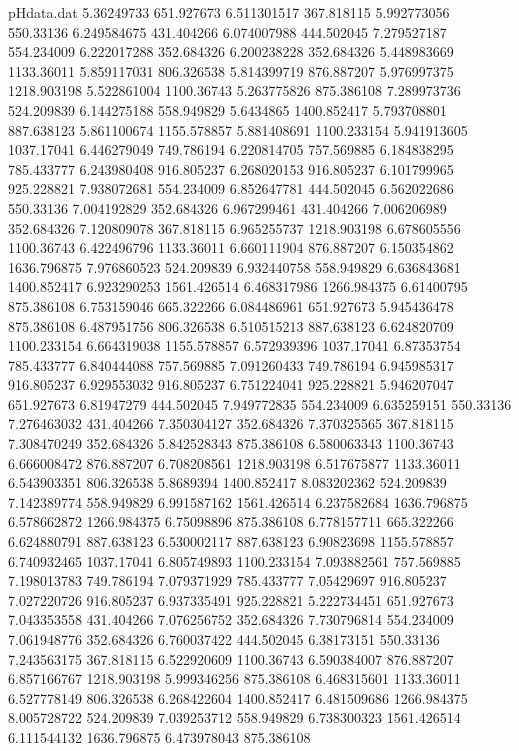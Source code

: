 \begin{filecontents}{pHdata.dat}
5.36249733	651.927673
6.511301517	367.818115
5.992773056	550.33136
6.249584675	431.404266
6.074007988	444.502045
7.279527187	554.234009
6.222017288	352.684326
6.200238228	352.684326
5.448983669	1133.36011
5.859117031	806.326538
5.814399719	876.887207
5.976997375	1218.903198
5.522861004	1100.36743
5.263775826	875.386108
7.289973736	524.209839
6.144275188	558.949829
5.6434865	1400.852417
5.793708801	887.638123
5.861100674	1155.578857
5.881408691	1100.233154
5.941913605	1037.17041
6.446279049	749.786194
6.220814705	757.569885
6.184838295	785.433777
6.243980408	916.805237
6.268020153	916.805237
6.101799965	925.228821
7.938072681	554.234009
6.852647781	444.502045
6.562022686	550.33136
7.004192829	352.684326
6.967299461	431.404266
7.006206989	352.684326
7.120809078	367.818115
6.965255737	1218.903198
6.678605556	1100.36743
6.422496796	1133.36011
6.660111904	876.887207
6.150354862	1636.796875
7.976860523	524.209839
6.932440758	558.949829
6.636843681	1400.852417
6.923290253	1561.426514
6.468317986	1266.984375
6.61400795	875.386108
6.753159046	665.322266
6.084486961	651.927673
5.945436478	875.386108
6.487951756	806.326538
6.510515213	887.638123
6.624820709	1100.233154
6.664319038	1155.578857
6.572939396	1037.17041
6.87353754	785.433777
6.840444088	757.569885
7.091260433	749.786194
6.945985317	916.805237
6.929553032	916.805237
6.751224041	925.228821
5.946207047	651.927673
6.81947279	444.502045
7.949772835	554.234009
6.635259151	550.33136
7.276463032	431.404266
7.350304127	352.684326
7.370325565	367.818115
7.308470249	352.684326
5.842528343	875.386108
6.580063343	1100.36743
6.666008472	876.887207
6.708208561	1218.903198
6.517675877	1133.36011
6.543903351	806.326538
5.8689394	1400.852417
8.083202362	524.209839
7.142389774	558.949829
6.991587162	1561.426514
6.237582684	1636.796875
6.578662872	1266.984375
6.75098896	875.386108
6.778157711	665.322266
6.624880791	887.638123
6.530002117	887.638123
6.90823698	1155.578857
6.740932465	1037.17041
6.805749893	1100.233154
7.093882561	757.569885
7.198013783	749.786194
7.079371929	785.433777
7.05429697	916.805237
7.027220726	916.805237
6.937335491	925.228821
5.222734451	651.927673
7.043353558	431.404266
7.076256752	352.684326
7.730796814	554.234009
7.061948776	352.684326
6.760037422	444.502045
6.38173151	550.33136
7.243563175	367.818115
6.522920609	1100.36743
6.590384007	876.887207
6.857166767	1218.903198
5.999346256	875.386108
6.468315601	1133.36011
6.527778149	806.326538
6.268422604	1400.852417
6.481509686	1266.984375
8.005728722	524.209839
7.039253712	558.949829
6.738300323	1561.426514
6.111544132	1636.796875
6.473978043	875.386108

\end{filecontents}
